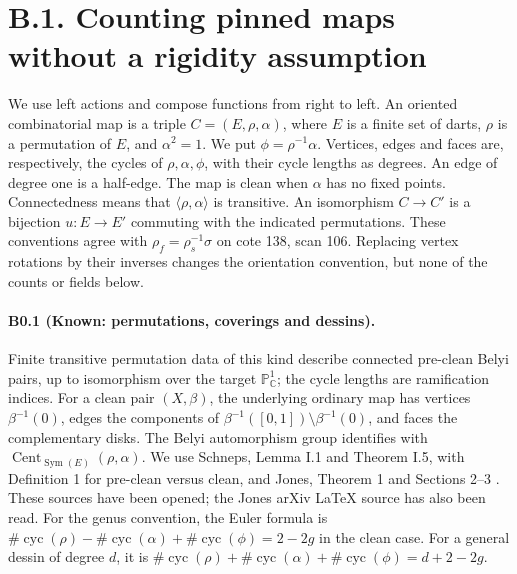 \section{B.1. Counting pinned maps without a rigidity assumption}

We use left actions and compose functions from right to left. An oriented
combinatorial map is a triple $C=(E,\rho,\alpha)$, where $E$ is a finite
set of darts, $\rho$ is a permutation of $E$, and $\alpha^2=1$.
We put $\phi=\rho^{-1}\alpha$. Vertices, edges and faces are, respectively,
the cycles of $\rho,\alpha,\phi$, with their cycle lengths as degrees.
An edge of degree one is a half-edge. The map is clean when $\alpha$
has no fixed points. Connectedness means that $\langle\rho,\alpha\rangle$
is transitive. An isomorphism $C\longrightarrow C'$ is a bijection
$u:E\longrightarrow E'$ commuting with the indicated permutations.
These conventions agree with $\rho_f=\rho_s^{-1}\sigma$ on cote 138,
scan 106. Replacing vertex rotations by their inverses changes the
orientation convention, but none of the counts or fields below.

\paragraph{B0.1 (Known: permutations, coverings and dessins).}
Finite transitive permutation data of this kind describe connected
pre-clean Belyi pairs, up to isomorphism over the target
$\mathbb P^1_{\mathbb C}$; the cycle lengths are ramification indices.
For a clean pair $(X,\beta)$, the underlying ordinary map has vertices
$\beta^{-1}(0)$, edges the components of
$\beta^{-1}([0,1])\setminus\beta^{-1}(0)$, and faces the complementary
disks. The Belyi automorphism group identifies with
$\operatorname{Cent}_{\operatorname{Sym}(E)}(\rho,\alpha)$.
We use Schneps, Lemma I.1 and Theorem I.5, with Definition 1 for
pre-clean versus clean, and Jones, Theorem 1 and Sections 2--3
\cite{Schneps1994B,Jones2018B}. These sources have been opened;
the Jones arXiv \LaTeX{} source has also been read.
For the genus convention, the Euler formula is
$\#\operatorname{cyc}(\rho)-\#\operatorname{cyc}(\alpha)
+\#\operatorname{cyc}(\phi)=2-2g$ in the clean case.
For a general dessin of degree $d$, it is
$\#\operatorname{cyc}(\rho)+\#\operatorname{cyc}(\alpha)
+\#\operatorname{cyc}(\phi)=d+2-2g$.

